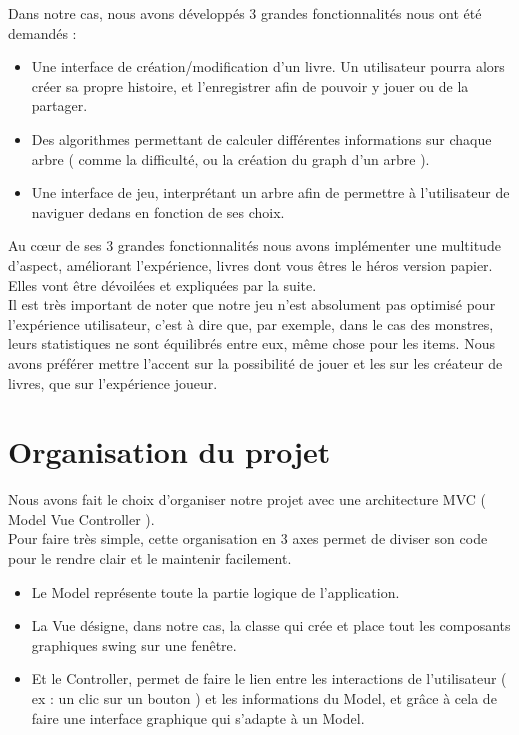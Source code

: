 \documentclass[12pt]{article}
\begin{document}
Dans notre cas, nous avons développés 3 grandes fonctionnalités nous ont été demandés :\\

\begin{itemize}
    \item Une interface de création/modification d'un livre. Un utilisateur pourra alors créer sa propre histoire, et l'enregistrer afin de pouvoir y jouer ou de la partager.\\
    \item Des algorithmes permettant de calculer différentes informations sur chaque arbre ( comme la difficulté, ou la création du graph d’un arbre ).\\
    \item Une interface de jeu, interprétant un arbre afin de permettre à l’utilisateur de naviguer dedans en fonction de ses choix.\\
\end{itemize}

Au cœur de ses 3 grandes fonctionnalités nous avons implémenter une multitude d'aspect, améliorant l'expérience, livres dont vous êtres le héros version papier. Elles vont être dévoilées et expliquées par la suite.\\

Il est très important de noter que notre jeu n'est absolument pas optimisé pour l'expérience utilisateur, c'est à dire que, par exemple, dans le cas des monstres, leurs statistiques ne sont équilibrés entre eux, même chose pour les items. Nous avons préférer mettre l'accent sur la possibilité de jouer et les sur les créateur de livres, que sur l'expérience joueur.

\section{Organisation du projet} %
Nous avons fait le choix d’organiser notre projet avec une architecture MVC ( Model Vue Controller ).\\

Pour faire très simple, cette organisation en 3 axes permet de diviser son code pour le rendre clair et le maintenir facilement.\\

\begin{itemize}
    \item Le Model représente toute la partie logique de l’application.\\
    \item La Vue désigne, dans notre cas, la classe qui crée et place tout les composants graphiques swing sur une fenêtre.\\
    \item Et le Controller, permet de faire le lien entre les interactions de l’utilisateur ( ex : un clic sur un bouton ) et les informations du Model, et grâce à cela de faire une interface graphique qui s’adapte à un Model.\\
\end{itemize}
\end{document}
